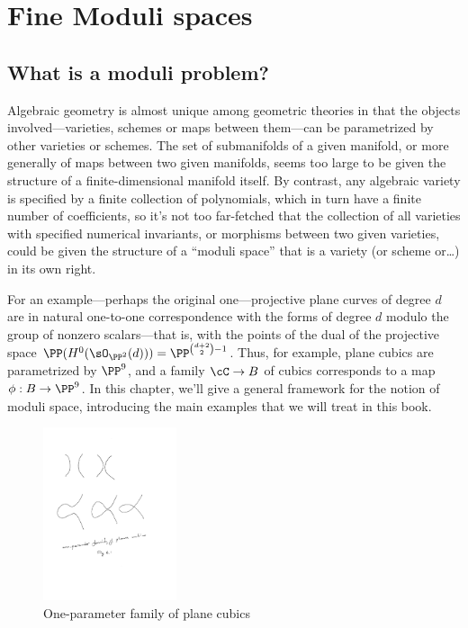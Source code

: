 

\chapter{Fine Moduli spaces} 
\label{Moduli chapter}\label{ModuliChapter}

\section{What is a moduli problem?}

Algebraic geometry is almost unique among geometric theories in that the objects involved---varieties,  schemes or maps between them---can be parametrized by other varieties or schemes. The set of submanifolds of a given manifold, or more generally of maps between two given manifolds, seems too large to be given the structure of a finite-dimensional manifold itself. By contrast, any algebraic variety is specified by a finite collection of polynomials, which in turn have a finite number of coefficients, so it's not too far-fetched that the collection of all varieties with specified numerical invariants, or morphisms between two given varieties, could be given the structure of a ``moduli space'' that is a variety (or scheme or\dots) in its own right.

For an example---perhaps the original one---projective plane curves of degree $d$
are in natural one-to-one correspondence with the forms of degree $d$ modulo the group of nonzero scalars---that is, with the points of the dual of the projective space
$ \PP(H^0(\sO_{\PP^2}(d)))=\PP^{\binom{d+2}{2}-1} $.
Thus, for example, plane cubics are parametrized by $\PP^{9}$, and a  family $\cC \to B$ of cubics corresponds to a map $\phi: B \to \PP^9$.
In this chapter, we'll give a general framework for the notion of moduli space, introducing the main examples that we will treat in this book.

\begin{figure}
 \caption{One-parameter family of plane cubics}
\centerline {\includegraphics[height=2in]{"Fig6.1.pdf"}}
\end{figure}
 
